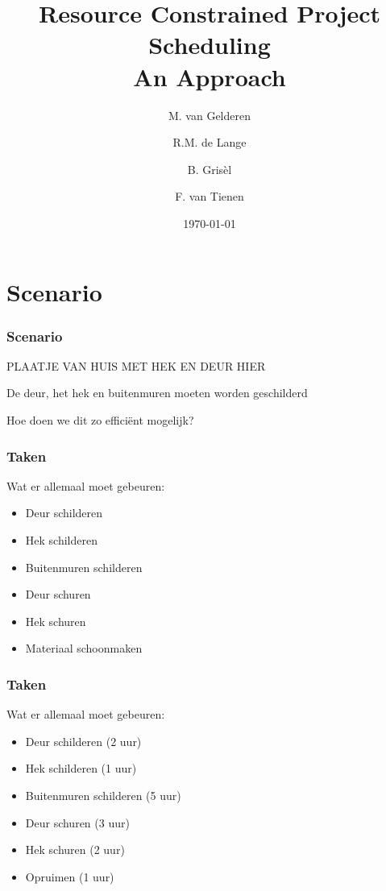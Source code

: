 \documentclass{beamer}
\title[RCPSP]{Resource Constrained Project Scheduling\\
An Approach}
\author{M. van Gelderen  \and
    R.M. de Lange \and
    B. Gris\`el \and
    F. van Tienen}
\institute{TU Delft}
\date{\today}
\theoremstyle{definition}
\begin{document}
\begin{frame}
\titlepage
\end{frame}


\section*{Scenario}

\begin{frame}
    \frametitle{Scenario}
    PLAATJE VAN HUIS MET HEK EN DEUR HIER
    
    \begin{center}
    	De deur, het hek en buitenmuren moeten worden geschilderd
    \end{center}
\end{frame}

\begin{frame}
    \begin{center}
    	Hoe doen we dit zo effici\"{e}nt mogelijk?
    \end{center}
\end{frame}

\begin{frame}
    \frametitle{Taken}
    Wat er allemaal moet gebeuren:
     \begin{itemize}
    	\item Deur schilderen
	\item Hek schilderen
	\item Buitenmuren schilderen
	\item<2-> Deur schuren
	\item<2-> Hek schuren
	\item<3-> Materiaal schoonmaken
    \end{itemize}
\end{frame}

\begin{frame}
    \frametitle{Taken}
    Wat er allemaal moet gebeuren:
     \begin{itemize}
    	\item Deur schilderen (2 uur)
	\item Hek schilderen (1 uur)
	\item Buitenmuren schilderen (5 uur)
	\item Deur schuren (3 uur)
	\item Hek schuren (2 uur)
	\item Opruimen (1 uur)
    \end{itemize}
\end{frame}
\end{document}
